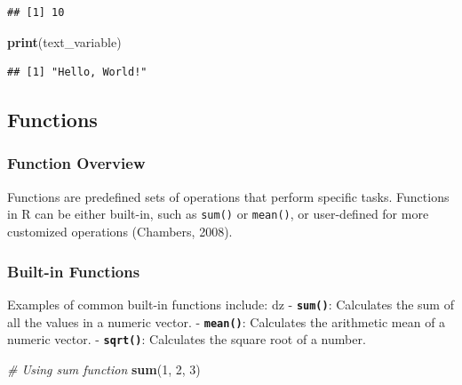 \documentclass[
  b5paper]{book}
\newenvironment{Shaded}{\begin{snugshade}}{\end{snugshade}}
\newcommand{\CommentTok}[1]{\textcolor[rgb]{0.56,0.35,0.01}{\textit{#1}}}
\newcommand{\DecValTok}[1]{\textcolor[rgb]{0.00,0.00,0.81}{#1}}
\newcommand{\FunctionTok}[1]{\textcolor[rgb]{0.13,0.29,0.53}{\textbf{#1}}}
\newcommand{\NormalTok}[1]{#1}
\begin{document}
\begin{verbatim}
## [1] 10
\end{verbatim}

\begin{Shaded}
\begin{Highlighting}[]
\FunctionTok{print}\NormalTok{(text\_variable)}
\end{Highlighting}
\end{Shaded}

\begin{verbatim}
## [1] "Hello, World!"
\end{verbatim}

\hypertarget{functions}{%
\subsection*{Functions}\label{functions}}

\hypertarget{function-overview}{%
\subsubsection*{Function Overview}\label{function-overview}}

Functions are predefined sets of operations that perform specific tasks. Functions in R can be either built-in, such as \texttt{sum()} or \texttt{mean()}, or user-defined for more customized operations (Chambers, 2008).

\hypertarget{built-in-functions}{%
\subsubsection*{Built-in Functions}\label{built-in-functions}}

Examples of common built-in functions include:
dz
- \textbf{\texttt{sum()}}: Calculates the sum of all the values in a numeric vector.
- \textbf{\texttt{mean()}}: Calculates the arithmetic mean of a numeric vector.
- \textbf{\texttt{sqrt()}}: Calculates the square root of a number.

\begin{Shaded}
\begin{Highlighting}[]
\CommentTok{\# Using sum function}
\FunctionTok{sum}\NormalTok{(}\DecValTok{1}\NormalTok{, }\DecValTok{2}\NormalTok{, }\DecValTok{3}\NormalTok{)}
\end{Highlighting}
\end{Shaded}
\end{document}
